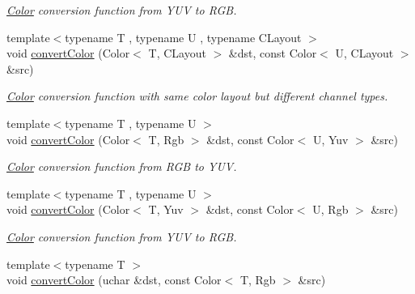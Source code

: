 \begin{DoxyCompactItemize}
\begin{DoxyCompactList}\small\item\em \hyperlink{class_d_o_1_1_color}{Color} conversion function from Y\-U\-V to R\-G\-B. \end{DoxyCompactList}\item 
\hypertarget{group___color_conversion_gaf425c8b1868616a6840c61fe4a3e60c7}{{\footnotesize template$<$typename T , typename U , typename C\-Layout $>$ }\\void \hyperlink{group___color_conversion_gaf425c8b1868616a6840c61fe4a3e60c7}{convert\-Color} (Color$<$ T, C\-Layout $>$ \&dst, const Color$<$ U, C\-Layout $>$ \&src)}\label{group___color_conversion_gaf425c8b1868616a6840c61fe4a3e60c7}

\begin{DoxyCompactList}\small\item\em \hyperlink{class_d_o_1_1_color}{Color} conversion function with same color layout but different channel types. \end{DoxyCompactList}\item 
\hypertarget{group___color_conversion_ga940c39e5cdcff0e182ad7f1911e1fdbb}{{\footnotesize template$<$typename T , typename U $>$ }\\void \hyperlink{group___color_conversion_ga940c39e5cdcff0e182ad7f1911e1fdbb}{convert\-Color} (Color$<$ T, Rgb $>$ \&dst, const Color$<$ U, Yuv $>$ \&src)}\label{group___color_conversion_ga940c39e5cdcff0e182ad7f1911e1fdbb}

\begin{DoxyCompactList}\small\item\em \hyperlink{class_d_o_1_1_color}{Color} conversion function from R\-G\-B to Y\-U\-V. \end{DoxyCompactList}\item 
\hypertarget{group___color_conversion_gaf208517efbfb2d905bdb2724145383e7}{{\footnotesize template$<$typename T , typename U $>$ }\\void \hyperlink{group___color_conversion_gaf208517efbfb2d905bdb2724145383e7}{convert\-Color} (Color$<$ T, Yuv $>$ \&dst, const Color$<$ U, Rgb $>$ \&src)}\label{group___color_conversion_gaf208517efbfb2d905bdb2724145383e7}

\begin{DoxyCompactList}\small\item\em \hyperlink{class_d_o_1_1_color}{Color} conversion function from Y\-U\-V to R\-G\-B. \end{DoxyCompactList}\item 
\hypertarget{group___color_conversion_ga11ec76ce23b7ed0a5df4cc76bb2afc2a}{{\footnotesize template$<$typename T $>$ }\\void \hyperlink{group___color_conversion_ga11ec76ce23b7ed0a5df4cc76bb2afc2a}{convert\-Color} (uchar \&dst, const Color$<$ T, Rgb $>$ \&src)}\label{group___color_conversion_ga11ec76ce23b7ed0a5df4cc76bb2afc2a}


\end{DoxyCompactItemize}
